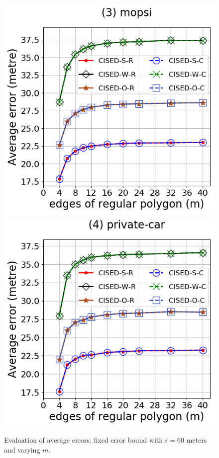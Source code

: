 \begin{figure}[tb!]
\includegraphics[scale = 0.30]{Figures/Exp-M-e-60-error-mopsi.png}
\includegraphics[scale = 0.30]{Figures/Exp-M-e-60-error-private.png}
\caption{\small Evaluation of average errors: fixed error bound with $\epsilon = 60$ meters and varying $m$.}
\label{fig:m-error-e60}
\end{figure}


